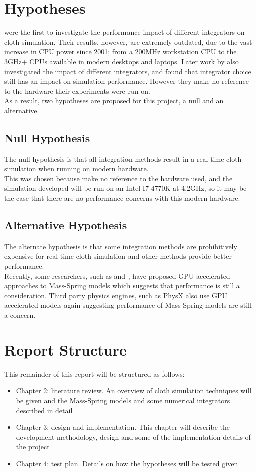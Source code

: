 \section{Hypotheses}
\textcite{Volino2001} were the first to investigate the performance impact of different integrators on cloth simulation. Their results, however, are extremely outdated, due to the vast increase in CPU power since 2001; from a 200MHz workstation CPU to the 3GHz+ CPUs available in modern desktops and laptops. Later work by \textcite{Wang2009a} also investigated the impact of different integrators, and found that integrator choice still has an impact on simulation performance. However they make no reference to the hardware their experiments were run on.
\\As a result, two hypotheses are proposed for this project, a null and an alternative.

\subsection{Null Hypothesis}
The null hypothesis is that all integration methods result in a real time cloth simulation when running on modern hardware.
\\This was chosen because \textcite{Wang2009a} make no reference to the hardware used, and the simulation developed will be run on an Intel I7 4770K at 4.2GHz, so it may be the case that there are no performance concerns with this modern hardware.

\subsection{Alternative Hypothesis}
The alternate hypothesis is that some integration methods are prohibitively expensive for real time cloth simulation and other methods provide better performance.
\\Recently, some researchers, such as \textcite{Zeller2005} and \textcite{Tang2013}, have proposed GPU accelerated approaches to Mass-Spring models which suggests that performance is still a consideration. Third party physics engines, such as PhysX\textsuperscript{\textregistered} also use GPU accelerated models \parencite{Kim2011} again suggesting performance of Mass-Spring models are still a concern.

\section{Report Structure}
This remainder of this report will be structured as follows:
\begin{itemize}
  \item{Chapter 2: literature review. An overview of cloth simulation techniques will be given and the Mass-Spring models and some numerical integrators described in detail}
  \item{Chapter 3: design and implementation. This chapter will describe the development methodology, design and some of the implementation details of the project}
  \item{Chapter 4: test plan. Details on how the hypotheses will be tested given}
\end{itemize}
